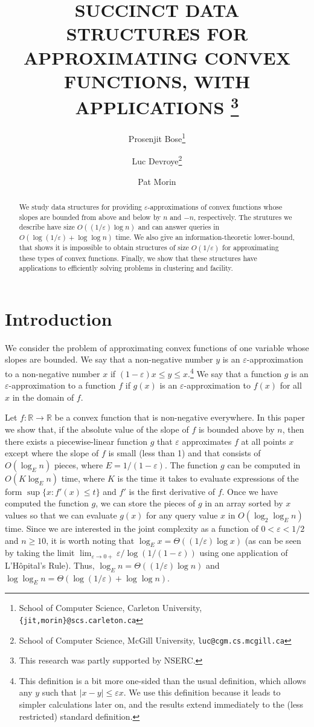 \documentclass[charterfonts,lotsofwhite]{patmorin}
\title{\MakeUppercase{Succinct Data Structures for Approximating
Convex Functions, with Applications}%
     \thanks{This research was partly supported by NSERC.}}
\author{Prosenjit Bose\thanks{School of Computer Science, Carleton
	University, \texttt{\{jit,morin\}@scs.carleton.ca}} \and
  Luc Devroye\thanks{School of Computer Science, McGill University,
  	\texttt{luc@cgm.cs.mcgill.ca}} \and 
  Pat Morin\footnotemark[3]}
\date{}
\newcommand{\eps}{\varepsilon}
\newcommand{\Real}{\mathbb{R}}
\begin{document}
\maketitle

\begin{abstract} 
We study data structures for providing $\eps$-approximations of convex
functions whose slopes are bounded from above and below by $n$ and
$-n$, respectively. The strutures we describe have size
$O((1/\eps)\log n)$ and can answer queries in $O(\log(1/\eps)+\log\log
n)$ time.  We also give an information-theoretic lower-bound, that
shows it is impossible to obtain structures of size $O(1/\eps)$ for
approximating these types of convex functions.  Finally, we show that
these structures have applications to efficiently solving problems in
clustering and facility.  
\end{abstract}

\section{Introduction}

We consider the problem of approximating convex functions of one
variable whose slopes are bounded.  We say that a non-negative number
$y$ is an $\eps$-approximation to a non-negative number $x$ if
$(1-\eps)x\le y \le x$.\footnote{This definition is a bit more
one-sided than the usual definition, which allows any $y$ such that
$|x-y|\le \eps x$.  We use this definition because it leads to simpler
calculations later on, and the results extend immediately to the (less
restricted) standard definition.}  We say that a function $g$ is an
$\eps$-approximation to a function $f$ if $g(x)$ is an
$\eps$-approximation to $f(x)$ for all $x$ in the domain of $f$.

Let $f:\Real\rightarrow \Real$ be a convex function that is
non-negative everywhere.  In this paper we show that, if the absolute
value of the slope of $f$ is bounded above by $n$, then there exists a
piecewise-linear function $g$ that $\eps$ approximates $f$ at all
points $x$ except where the slope of $f$ is small (less than 1) and
that consists of $O(\log_E n)$ pieces, where $E=1/(1-\eps)$.  The
function $g$ can be computed in $O(K\log_E n)$ time, where $K$ is the
time it takes to evaluate expressions of the form $\sup\{x: f'(x)\le
t\}$ and $f'$ is the first derivative of $f$.  Once we have computed
the function $g$, we can store the pieces of $g$ in an array sorted by
$x$ values so that we can evaluate $g(x)$ for any query value $x$ in
$O(\log_2\log_E n)$ time.  Since we are interested in the joint
complexity as a function of $0<\eps < 1/2$ and $n \ge 10$, it is worth
noting that $\log_E x = \Theta ( (1/\eps) \log x)$ (as can be seen by
taking the limit $\lim_{\eps\rightarrow 0+}\eps/\log(1/(1-\eps))$
using one application of L'H\^opital's Rule). Thus, $\log_E
n=\Theta((1/\eps)\log n)$ and $\log\log_E n = \Theta (\log (1/\eps) +
\log \log n)$.
\end{document}
